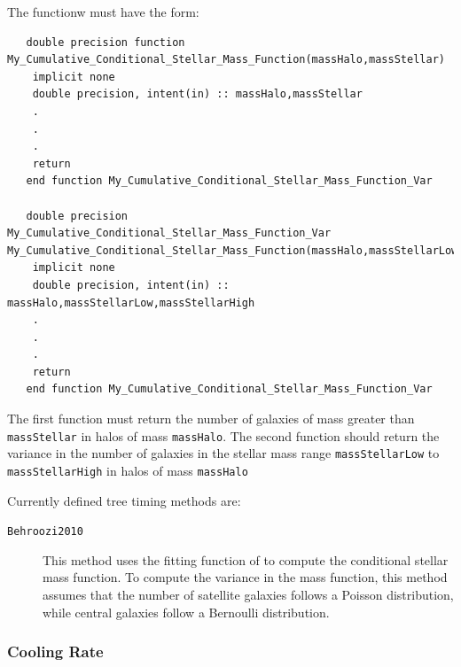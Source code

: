 The functionw must have the form:
\begin{verbatim}
   double precision function My_Cumulative_Conditional_Stellar_Mass_Function(massHalo,massStellar)
    implicit none
    double precision, intent(in) :: massHalo,massStellar
    .
    .
    .
    return
   end function My_Cumulative_Conditional_Stellar_Mass_Function_Var

   double precision My_Cumulative_Conditional_Stellar_Mass_Function_Var My_Cumulative_Conditional_Stellar_Mass_Function(massHalo,massStellarLow,massStellarHigh)
    implicit none
    double precision, intent(in) :: massHalo,massStellarLow,massStellarHigh
    .
    .
    .
    return
   end function My_Cumulative_Conditional_Stellar_Mass_Function_Var 
\end{verbatim}
The first function must return the number of galaxies of mass greater than {\tt massStellar} in halos of mass {\tt massHalo}. The second function should return the variance in the number of galaxies in the stellar mass range {\tt massStellarLow} to {\tt massStellarHigh} in halos of mass {\tt massHalo}

Currently defined tree timing methods are:
\begin{description}
 \item [{\tt Behroozi2010}] This method uses the fitting function of \cite{behroozi_comprehensive_2010} to compute the conditional stellar mass function. To compute the variance in the mass function, this method assumes that the number of satellite galaxies follows a Poisson distribution, while central galaxies follow a \gls{Bernoulli distribution}.
\end{description}

\subsubsection{Cooling Rate}

